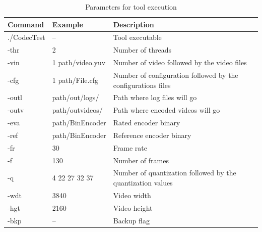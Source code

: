 \documentclass{acm_proc_article-sp}
\begin{document}
\begin{table}[!ht]
\centering
\caption{Parameters for tool execution}
\label{parameter_tool}
\begin{tabular}{|l|l|p{3cm}|l|}
\hline
\textbf{Command} & \textbf{Example}      & \textbf{Description}                                         \\ \hline
./CodecTest      & --                    & Tool executable                                                             \\ \hline
-thr             & 2                     & Number of threads                                            \\ \hline
-vin             & 1 path/video.yuv  & Number of video followed by the video files                  \\ \hline
-cfg             & 1 path/File.cfg & Number of configuration followed by the configurations files \\ \hline
-outl            & path/out/logs/      & Path where log files will go                                 \\ \hline
-outv            & path/outvideos/    & Path where encoded videos will go                            \\ \hline
-eva             & path/BinEncoder    & Rated encoder binary                                         \\ \hline
-ref             & path/BinEncoder    & Reference encoder binary                                     \\ \hline
-fr              & 30                    & Frame rate                                                   \\ \hline
-f               & 130                   & Number of frames                                             \\ \hline
-q             	 & 4 22 27 32 37        & Number of quantization followed by the quantization values   \\ 
\hline
-wdt             & 3840                  & Video width                                                  \\ \hline
-hgt             & 2160                  & Video height                                                 \\ \hline
-bkp             & --                    & Backup flag                                                  \\ \hline
\end{tabular}
\end{table}
\FloatBarrier
\end{document}
